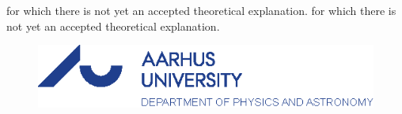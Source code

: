 \documentclass[../main.tex]{subfiles} %
\begin{document}
for which there is not yet an accepted theoretical explanation. for which there is not yet an accepted theoretical explanation.

\vfill
\vspace{2em}

\begin{figure}[ht!] %
    \begin{center}
        \includegraphics[width=\textwidth]{afterText/backCoverImages/AUDepartmentLogoBlue.eps}
    \end{center}
\end{figure} %

\restoregeometry %
\end{document}
